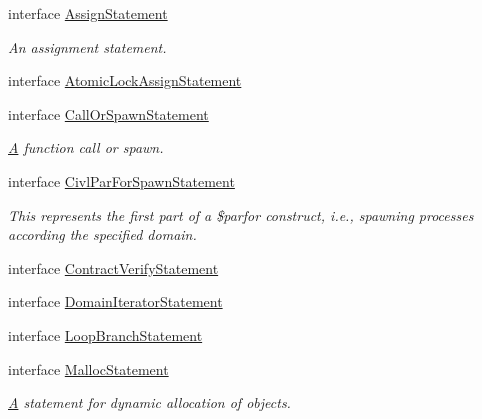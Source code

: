 \begin{DoxyCompactItemize}
\item 
interface \hyperlink{interfaceedu_1_1udel_1_1cis_1_1vsl_1_1civl_1_1model_1_1IF_1_1statement_1_1AssignStatement}{Assign\+Statement}
\begin{DoxyCompactList}\small\item\em An assignment statement. \end{DoxyCompactList}\item 
interface \hyperlink{interfaceedu_1_1udel_1_1cis_1_1vsl_1_1civl_1_1model_1_1IF_1_1statement_1_1AtomicLockAssignStatement}{Atomic\+Lock\+Assign\+Statement}
\item 
interface \hyperlink{interfaceedu_1_1udel_1_1cis_1_1vsl_1_1civl_1_1model_1_1IF_1_1statement_1_1CallOrSpawnStatement}{Call\+Or\+Spawn\+Statement}
\begin{DoxyCompactList}\small\item\em \hyperlink{structA}{A} function call or spawn. \end{DoxyCompactList}\item 
interface \hyperlink{interfaceedu_1_1udel_1_1cis_1_1vsl_1_1civl_1_1model_1_1IF_1_1statement_1_1CivlParForSpawnStatement}{Civl\+Par\+For\+Spawn\+Statement}
\begin{DoxyCompactList}\small\item\em This represents the first part of a \$parfor construct, i.\+e., spawning processes according the specified domain. \end{DoxyCompactList}\item 
interface \hyperlink{interfaceedu_1_1udel_1_1cis_1_1vsl_1_1civl_1_1model_1_1IF_1_1statement_1_1ContractVerifyStatement}{Contract\+Verify\+Statement}
\item 
interface \hyperlink{interfaceedu_1_1udel_1_1cis_1_1vsl_1_1civl_1_1model_1_1IF_1_1statement_1_1DomainIteratorStatement}{Domain\+Iterator\+Statement}
\item 
interface \hyperlink{interfaceedu_1_1udel_1_1cis_1_1vsl_1_1civl_1_1model_1_1IF_1_1statement_1_1LoopBranchStatement}{Loop\+Branch\+Statement}
\item 
interface \hyperlink{interfaceedu_1_1udel_1_1cis_1_1vsl_1_1civl_1_1model_1_1IF_1_1statement_1_1MallocStatement}{Malloc\+Statement}
\begin{DoxyCompactList}\small\item\em \hyperlink{structA}{A} statement for dynamic allocation of objects. \end{DoxyCompactList}\item 

\end{DoxyCompactItemize}
